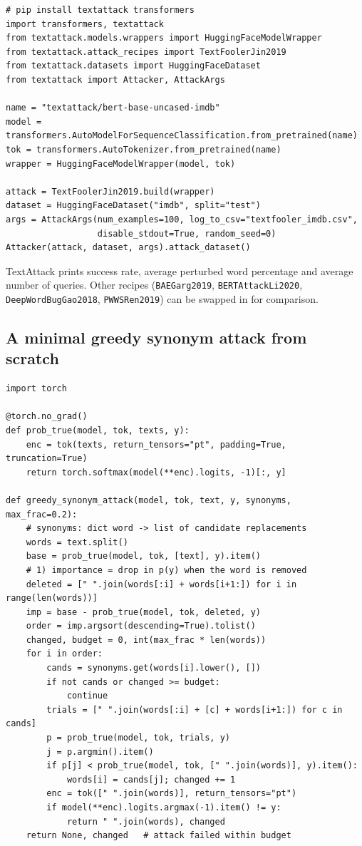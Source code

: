 \documentclass[10pt,a4paper]{extarticle}
\theoremstyle{definition}
\begin{document}
\begin{lstlisting}
# pip install textattack transformers
import transformers, textattack
from textattack.models.wrappers import HuggingFaceModelWrapper
from textattack.attack_recipes import TextFoolerJin2019
from textattack.datasets import HuggingFaceDataset
from textattack import Attacker, AttackArgs

name = "textattack/bert-base-uncased-imdb"
model = transformers.AutoModelForSequenceClassification.from_pretrained(name)
tok = transformers.AutoTokenizer.from_pretrained(name)
wrapper = HuggingFaceModelWrapper(model, tok)

attack = TextFoolerJin2019.build(wrapper)
dataset = HuggingFaceDataset("imdb", split="test")
args = AttackArgs(num_examples=100, log_to_csv="textfooler_imdb.csv",
                  disable_stdout=True, random_seed=0)
Attacker(attack, dataset, args).attack_dataset()
\end{lstlisting}

TextAttack prints success rate, average perturbed word percentage and average number of queries. Other recipes (\texttt{BAEGarg2019}, \texttt{BERTAttackLi2020}, \texttt{DeepWordBugGao2018}, \texttt{PWWSRen2019}) can be swapped in for comparison.

\subsection{A minimal greedy synonym attack from scratch}

\begin{lstlisting}
import torch

@torch.no_grad()
def prob_true(model, tok, texts, y):
    enc = tok(texts, return_tensors="pt", padding=True, truncation=True)
    return torch.softmax(model(**enc).logits, -1)[:, y]

def greedy_synonym_attack(model, tok, text, y, synonyms, max_frac=0.2):
    # synonyms: dict word -> list of candidate replacements
    words = text.split()
    base = prob_true(model, tok, [text], y).item()
    # 1) importance = drop in p(y) when the word is removed
    deleted = [" ".join(words[:i] + words[i+1:]) for i in range(len(words))]
    imp = base - prob_true(model, tok, deleted, y)
    order = imp.argsort(descending=True).tolist()
    changed, budget = 0, int(max_frac * len(words))
    for i in order:
        cands = synonyms.get(words[i].lower(), [])
        if not cands or changed >= budget:
            continue
        trials = [" ".join(words[:i] + [c] + words[i+1:]) for c in cands]
        p = prob_true(model, tok, trials, y)
        j = p.argmin().item()
        if p[j] < prob_true(model, tok, [" ".join(words)], y).item():
            words[i] = cands[j]; changed += 1
        enc = tok([" ".join(words)], return_tensors="pt")
        if model(**enc).logits.argmax(-1).item() != y:
            return " ".join(words), changed
    return None, changed   # attack failed within budget
\end{lstlisting}
\end{document}
